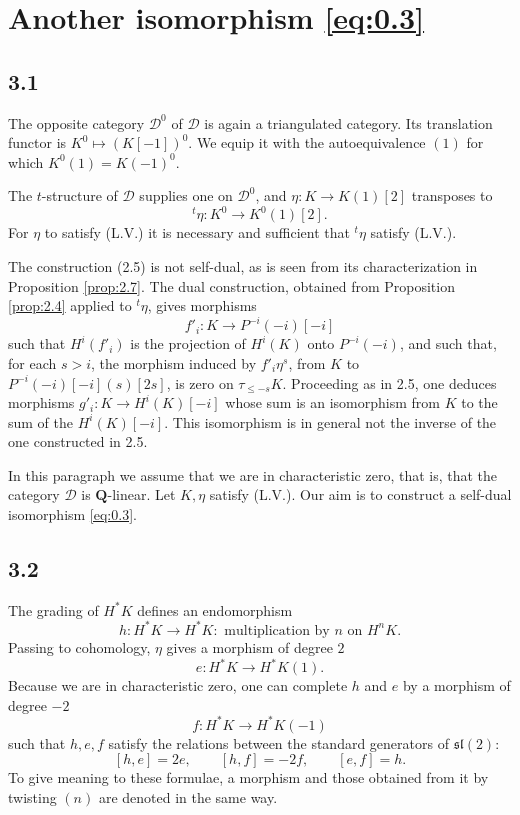 \documentclass[11pt,a4paper]{article}
\theoremstyle{plain}
\theoremstyle{definition}
\theoremstyle{remark}
\newcommand{\cD}{\mathscr{D}}
\newcommand{\bQ}{\mathbf{Q}}
\begin{document}
\section{Another isomorphism \eqref{eq:0.3}}

\subsection*{3.1}
The opposite category $\cD^0$ of $\cD$ is again a triangulated category. Its translation functor is $K^0\mapsto (K[-1])^0$. We equip it with the autoequivalence $(1)$ for which $K^0(1)=K(-1)^0$.

The $t$-structure of $\cD$ supplies one on $\cD^0$, and $\eta\colon K\to K(1)[2]$ transposes to
\[
{}^t\eta\colon K^0\to K^0(1)[2].
\]
For $\eta$ to satisfy (L.V.) it is necessary and sufficient that ${}^t\eta$ satisfy (L.V.).

The construction (2.5) is not self-dual, as is seen from its characterization in Proposition \ref{prop:2.7}. The dual construction, obtained from Proposition \ref{prop:2.4} applied to ${}^t\eta$, gives morphisms
\[
f'_i\colon K\to P^{-i}(-i)[-i]
\]
such that $H^i(f'_i)$ is the projection of $H^i(K)$ onto $P^{-i}(-i)$, and such that, for each $s>i$, the morphism induced by $f'_i\eta^s$, from $K$ to $P^{-i}(-i)[-i](s)[2s]$, is zero on $\tau_{\leqslant -s}K$. Proceeding as in 2.5, one deduces morphisms $g'_i\colon K\to H^i(K)[-i]$ whose sum is an isomorphism from $K$ to the sum of the $H^i(K)[-i]$. This isomorphism is in general not the inverse of the one constructed in 2.5.

In this paragraph we assume that we are in characteristic zero, that is, that the category $\cD$ is $\bQ$-linear. Let $K,\eta$ satisfy (L.V.). Our aim is to construct a self-dual isomorphism \eqref{eq:0.3}.

\subsection*{3.2}
The grading of $H^*K$ defines an endomorphism
\[
h\colon H^*K\to H^*K:
\text{ multiplication by }n\text{ on }H^nK.
\]
Passing to cohomology, $\eta$ gives a morphism of degree $2$
\[
e\colon H^*K\to H^*K(1).
\]
Because we are in characteristic zero, one can complete $h$ and $e$ by a morphism of degree $-2$
\[
f\colon H^*K\to H^*K(-1)
\]
such that $h,e,f$ satisfy the relations between the standard generators of $\mathfrak{sl}(2)$:
\[
[h,e]=2e,\qquad [h,f]=-2f,\qquad [e,f]=h.
\]
To give meaning to these formulae, a morphism and those obtained from it by twisting $(n)$ are denoted in the same way.
\end{document}
